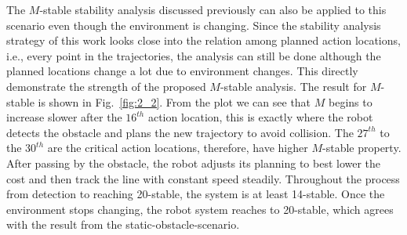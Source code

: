 The $M$-stable stability analysis discussed previously can also be applied to this scenario even though the environment is changing. Since the stability analysis strategy of this work looks close into the relation among planned action locations, i.e., every point in the trajectories, the analysis can still be done although the planned locations change a lot due to environment changes. This directly demonstrate the strength of the proposed $M$-stable analysis. The result for $M$-stable is shown in Fig.~\ref{fig:2_2}. From the plot we can see that $M$ begins to increase slower after the $16^{th}$ action location, this is exactly where the robot detects the obstacle and plans the new trajectory to avoid collision. The $27^{th}$ to the $30^{th}$ are the critical action locations, therefore, have higher $M$-stable property. After passing by the obstacle, the robot adjusts its planning to best lower the cost and then track the line with constant speed steadily. Throughout the process from detection to reaching 20-stable, the system is at least 14-stable. Once the environment stops changing, the robot system reaches to 20-stable, which agrees with the result from the static-obstacle-scenario.     


